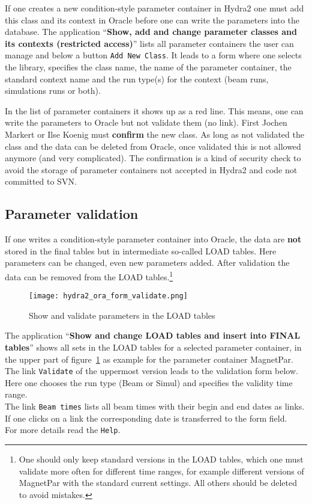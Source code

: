 If one creates a new condition-style parameter container in Hydra2 one must add this class and its context in Oracle before 
one can write the parameters into the database.
The application ``\textbf{Show, add and change parameter classes and its contexts (restricted access)}'' lists all parameter 
containers the user can manage and below a button \verb+Add New Class+. It leads to a form where one selects the library, 
specifies the class name, the name of the parameter container, the standard context name and the run type(s) for the
context (beam runs, simulations runs or both).

In the list of parameter containers it shows up as a red line. This means, one can write the parameters to Oracle but 
not validate them (no link). First Jochen Markert or Ilse Koenig must \textbf{confirm} the new class. As long as not validated 
the class and the data can be deleted from Oracle, once validated this is not allowed anymore (and very complicated).
The confirmation is a kind of security check to avoid the storage of parameter containers not accepted in Hydra2 and code not 
committed to SVN.

\subsection[Parameter validation]{Parameter validation} \label{sec:oraParameterValidation}

If one writes a condition-style parameter container into Oracle, the data are \textbf{not} stored in the final tables but 
in intermediate so-called LOAD tables. Here parameters can be changed, even new parameters added. After validation the 
data can be removed from the LOAD tables.\footnote{One should only keep standard versions in the LOAD tables, which one must validate more often 
for different time ranges, for example different versions of MagnetPar with the standard current settings. All others should 
be deleted to avoid mistakes.}

\begin{figure}[\htb]
  \centering
  \texttt{[image: hydra2\_ora\_form\_validate.png]}
  \caption[Show and validate parameters in the LOAD tables]{Show and validate parameters in the LOAD tables}
  \label{fig:oraFormValidate}
\end{figure}

The application ``\textbf{Show and change LOAD tables and insert into FINAL tables}'' shows all sets in the LOAD tables for  
a selected parameter container, in the upper part of figure~\ref{fig:oraFormValidate} as example for the parameter 
container MagnetPar. The link \verb+Validate+ of the uppermost version leads to the validation form below. Here one chooses 
the run type (Beam or Simul) and specifies the validity time range.\\
The link \verb+Beam times+ lists all beam times with their begin and end dates as links. If one clicks on a link the 
corresponding date is transferred to the form field.\\
For more details read the \verb+Help+.\\

